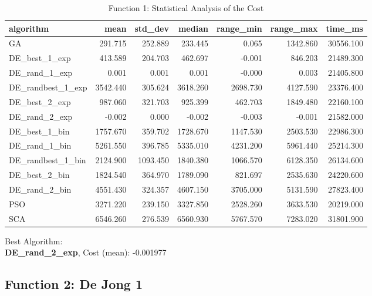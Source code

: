 \documentclass[12pt]{article}
\begin{document}
\begin{table}[H]
    \centering
    \footnotesize
\begin{tabular}{lrrrrrr}
\toprule
         algorithm &     mean &  std\_dev &   median &  range\_min &  range\_max &   time\_ms \\
\midrule
                GA &  291.715 &  252.889 &  233.445 &      0.065 &   1342.860 & 30556.100 \\
     DE\_best\_1\_exp &  413.589 &  204.703 &  462.697 &     -0.001 &    846.203 & 21489.300 \\
     DE\_rand\_1\_exp &    0.001 &    0.001 &    0.001 &     -0.000 &      0.003 & 21405.800 \\
 DE\_randbest\_1\_exp & 3542.440 &  305.624 & 3618.260 &   2698.730 &   4127.590 & 23376.400 \\
     DE\_best\_2\_exp &  987.060 &  321.703 &  925.399 &    462.703 &   1849.480 & 22160.100 \\
     DE\_rand\_2\_exp &   -0.002 &    0.000 &   -0.002 &     -0.003 &     -0.001 & 21582.000 \\
     DE\_best\_1\_bin & 1757.670 &  359.702 & 1728.670 &   1147.530 &   2503.530 & 22986.300 \\
     DE\_rand\_1\_bin & 5261.550 &  396.785 & 5335.010 &   4231.200 &   5961.440 & 25214.300 \\
 DE\_randbest\_1\_bin & 2124.900 & 1093.450 & 1840.380 &   1066.570 &   6128.350 & 26134.600 \\
     DE\_best\_2\_bin & 1824.540 &  364.970 & 1789.090 &    821.697 &   2535.630 & 24220.600 \\
     DE\_rand\_2\_bin & 4551.430 &  324.357 & 4607.150 &   3705.000 &   5131.590 & 27823.400 \\
               PSO & 3271.220 &  239.150 & 3327.850 &   2528.260 &   3633.530 & 20219.000 \\
               SCA & 6546.260 &  276.539 & 6560.930 &   5767.570 &   7283.020 & 31801.900 \\
\bottomrule
\end{tabular}

\caption{Function 1: Statistical Analysis of the Cost} 
    \end{table}
Best Algorithm: \\
\textbf{DE\_rand\_2\_exp}, Cost (mean): -0.001977\\
\newpage
\subsection{Function 2: De Jong 1}
\end{document}
